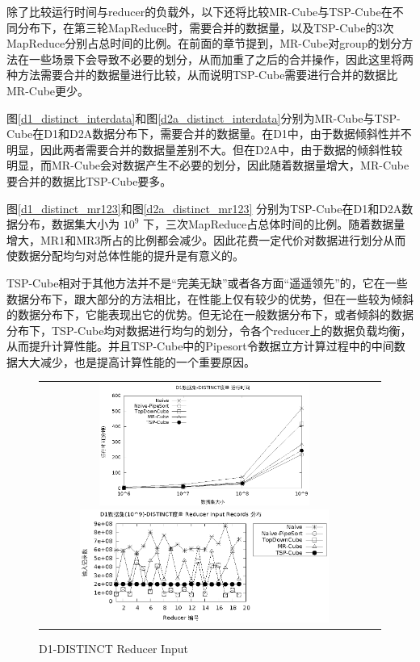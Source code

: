 除了比较运行时间与reducer的负载外，以下还将比较MR-Cube与TSP-Cube在不同分布下，在第三轮MapReduce时，需要合并的数据量，以及TSP-Cube的3次MapReduce分别占总时间的比例。在前面的章节提到，MR-Cube对group的划分方法在一些场景下会导致不必要的划分，从而加重了之后的合并操作，因此这里将两种方法需要合并的数据量进行比较，从而说明TSP-Cube需要进行合并的数据比MR-Cube更少。

图\ref{d1_distinct_interdata}和图\ref{d2a_distinct_interdata}分别为MR-Cube与TSP-Cube在D1和D2A数据分布下，需要合并的数据量。在D1中，由于数据倾斜性并不明显，因此两者需要合并的数据量差别不大。但在D2A中，由于数据的倾斜性较明显，而MR-Cube会对数据产生不必要的划分，因此随着数据量增大，MR-Cube要合并的数据比TSP-Cube要多。

图\ref{d1_distinct_mr123}和图\ref{d2a_distinct_mr123} 分别为TSP-Cube在D1和D2A数据分布，数据集大小为 ${10}^{9}$ 下，三次MapReduce占总体时间的比例。随着数据量增大，MR1和MR3所占的比例都会减少。因此花费一定代价对数据进行划分从而使数据分配均匀对总体性能的提升是有意义的。

TSP-Cube相对于其他方法并不是``完美无缺”或者各方面``遥遥领先”的，它在一些数据分布下，跟大部分的方法相比，在性能上仅有较少的优势，但在一些较为倾斜的数据分布下，它能表现出它的优势。但无论在一般数据分布下，或者倾斜的数据分布下，TSP-Cube均对数据进行均匀的划分，令各个reducer上的数据负载均衡，从而提升计算性能。并且TSP-Cube中的Pipesort令数据立方计算过程中的中间数据大大减少，也是提高计算性能的一个重要原因。

\begin{figure}[!ht]
\begin{tabular}{cc}

\begin{minipage}[t]{0.4\textwidth}
\centering\includegraphics[width=2.7in]{picture/ch_experiment_gnuplot_eps/d1_distinct_time} 
\caption{D1-DISTINCT 运行时间}\label{d1_distinct_time} 
\end{minipage}

\begin{minipage}[t]{0.6\textwidth}
\centering\includegraphics[width=3.2in]{picture/ch_experiment_gnuplot_eps/d1_distinct_input} 
\caption{D1-DISTINCT Reducer Input}\label{d1_distinct_input} 
\end{minipage}

\end{tabular}
\end{figure}



